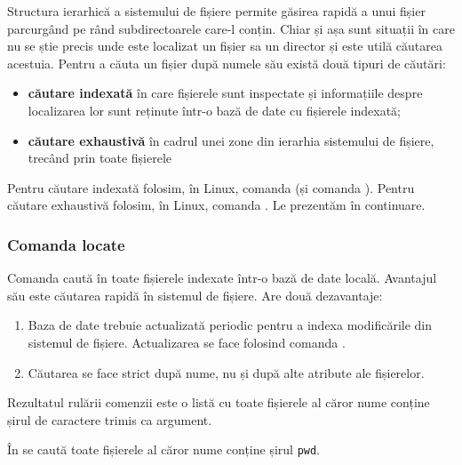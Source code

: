 Structura ierarhică a sistemului de fișiere permite găsirea rapidă a unui fișier parcurgând pe rând subdirectoarele care-l conțin. Chiar și așa sunt situații în care nu se știe precis unde este localizat un fișier sa un director și este utilă căutarea acestuia. Pentru a căuta un fișier după numele său există două tipuri de căutări:
\begin{itemize}
  \item \textbf{căutare indexată} în care fișierele sunt inspectate și informațiile despre localizarea lor sunt reținute într-o bază de date cu fișierele indexată;
  \item \textbf{căutare exhaustivă} în cadrul unei zone din ierarhia sistemului de fișiere, trecând prin toate fișierele
\end{itemize}

Pentru căutare indexată folosim, în Linux, comanda  (și comanda ). Pentru căutare exhaustivă folosim, în Linux, comanda . Le prezentăm în continuare.

\subsubsection{Comanda locate}
\label{sec:fs:locate}

Comanda  caută în toate fișierele indexate într-o bază de date locală. Avantajul său este căutarea rapidă în sistemul de fișiere. Are două dezavantaje:
\begin{enumerate}
  \item Baza de date trebuie actualizată periodic pentru a indexa modificările din sistemul de fișiere. Actualizarea se face folosind comanda .
  \item Căutarea se face strict după nume, nu și după alte atribute ale fișierelor.
\end{enumerate}

Rezultatul rulării comenzii este o listă cu toate fișierele al căror nume conține șirul de caractere trimis ca argument.

În  se caută toate fișierele al căror nume conține șirul \texttt{pwd}.



